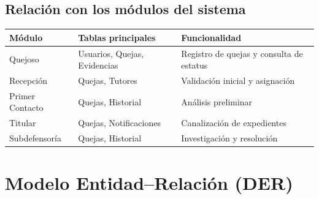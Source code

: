 \documentclass[11pt,letterpaper]{article}
\begin{document}
\tableofcontents
\newpage


\subsection{Relación con los módulos del sistema}
\begin{longtable}{|p{4cm}|p{4.5cm}|p{6cm}|}
\hline
\rowcolor{lightgray} \textbf{Módulo} & \textbf{Tablas principales} & \textbf{Funcionalidad} \\
\hline
Quejoso & Usuarios, Quejas, Evidencias & Registro de quejas y consulta de estatus \\
\hline
Recepción & Quejas, Tutores & Validación inicial y asignación \\
\hline
Primer Contacto & Quejas, Historial & Análisis preliminar \\
\hline
Titular & Quejas, Notificaciones & Canalización de expedientes \\
\hline
Subdefensoría & Quejas, Historial & Investigación y resolución \\
\hline
\end{longtable}

\section{Modelo Entidad–Relación (DER)}
\end{document}
